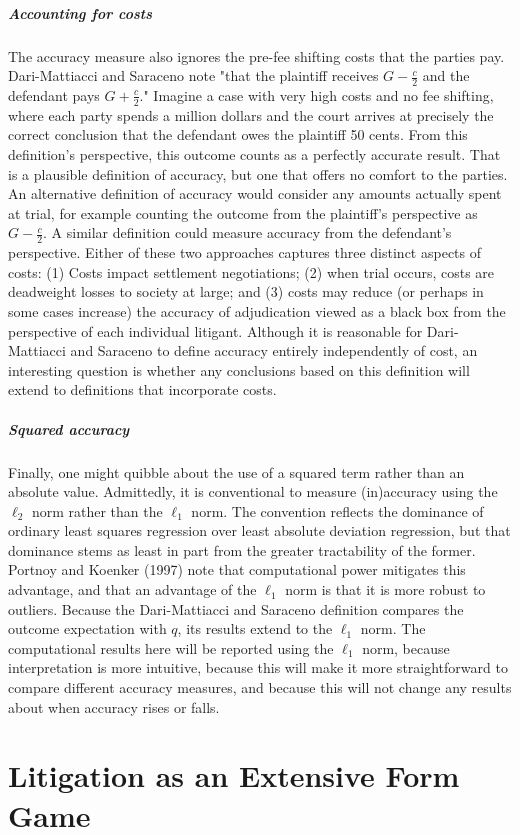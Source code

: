 \documentclass{article}
\begin{document}
\subparagraph{Accounting for costs}The accuracy measure also ignores the pre-fee shifting costs that the parties pay. Dari-Mattiacci and Saraceno note "that the plaintiff receives $G - \frac{c}{2}$ and the defendant pays $G + \frac{c}{2}$." Imagine a case with very high costs and no fee shifting, where each party spends a million dollars and the court arrives at precisely the correct conclusion that the defendant owes the plaintiff 50 cents. From this definition's perspective, this outcome counts as a perfectly accurate result. That is a plausible definition of accuracy, but one that offers no comfort to the parties. An alternative definition of accuracy would consider any amounts actually spent at trial, for example counting the outcome from the plaintiff's perspective as $G - \frac{c}{2}$. A similar definition could measure accuracy from the defendant's perspective. Either of these two approaches captures three distinct aspects of costs: (1) Costs impact settlement negotiations; (2) when trial occurs, costs are deadweight losses to society at large; and (3) costs may reduce (or perhaps in some cases increase) the accuracy of adjudication viewed as a black box from the perspective of each individual litigant. Although it is reasonable for Dari-Mattiacci and Saraceno to define accuracy entirely independently of cost, an interesting question is whether any conclusions based on this definition will extend to definitions that incorporate costs.

\subparagraph{Squared accuracy}Finally, one might quibble about the use of a squared term rather than an absolute value. Admittedly, it is conventional to measure (in)accuracy using the $\ell_2$ norm rather than the $\ell_1$ norm. The convention reflects the dominance of ordinary least squares regression over least absolute deviation regression, but that dominance stems as least in part from the greater tractability of the former. Portnoy and Koenker (1997) \cite{portnoykoenker1997} note that computational power mitigates this advantage, and that an advantage of the $\ell_1$ norm is that it is more robust to outliers. Because the Dari-Mattiacci and Saraceno definition compares the outcome expectation with $q$, its results extend to the $\ell_1$ norm. The computational results here will be reported using the $\ell_1$ norm, because interpretation is more intuitive, because this will make it more straightforward to compare different accuracy measures, and because this will not change any results about when accuracy rises or falls.


\section{Litigation as an Extensive Form Game}
\end{document}
